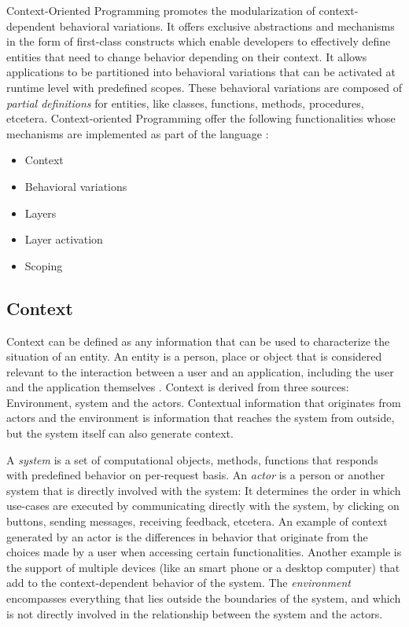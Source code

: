 \documentclass{acm_proc_article-sp}
\begin{document}
Context-Oriented Programming promotes the modularization of context-dependent behavioral variations. It offers exclusive abstractions and mechanisms in the form of first-class constructs which enable developers to effectively define entities that need to change behavior depending on their context. It allows applications to be partitioned into behavioral variations that can be activated at runtime level with predefined scopes. These behavioral variations are composed of \textit{partial definitions} for entities, like classes, functions, methods, procedures, etcetera. Context-oriented Programming offer the following functionalities whose mechanisms are implemented as part of the language \cite{Costanza:2008:CPC:1529966.1529970}:

\begin{itemize}
\item {Context}
\item Behavioral variations
\item Layers
\item Layer activation
\item Scoping
\end{itemize}

\subsection{Context}
\label{sec:context}
Context can be defined as any information that can be used to characterize the situation of an entity. An entity is a person, place or object that is considered relevant to the interaction between a user and an application, including the user and the application themselves \cite{Abowd:1999:TBU:647985.743843}. Context is derived from three sources: Environment, system and the actors. Contextual information that originates from actors and the environment is information that reaches the system from outside, but the system itself can also generate context. 

A \textit{system} is a set of computational objects, methods, functions that responds with predefined behavior on per-request basis. An \textit{actor} is a person or another system that is directly involved with the system: It determines the order in which use-cases are executed by communicating directly with the system, by clicking on buttons, sending messages, receiving feedback, etcetera. An example of context generated by an actor is the differences in behavior that originate from the choices made by a user when accessing certain functionalities. Another example is the support of multiple devices (like an smart phone or a desktop computer) that add to the context-dependent behavior of the system. The \textit{environment} encompasses everything that lies outside the boundaries of the system, and which is not directly involved in the relationship between the system and the actors.
\end{document}
